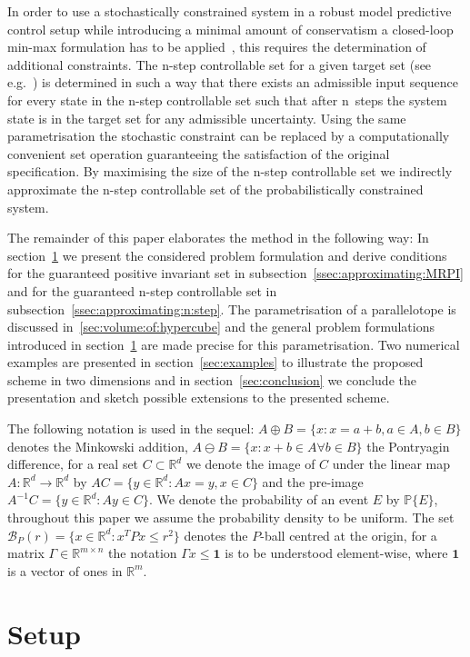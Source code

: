 \documentclass{ifacconf}
\providecommand{\B}{\mathcal B}
\providecommand{\PP}{\mathbb P}
\providecommand{\RR}{\mathbb R}
\providecommand{\bfa}[1]{\mathbf{#1}}
\begin{document}
In order to use a stochastically constrained system in a robust model predictive control setup while introducing a minimal amount of conservatism a closed-loop min-max formulation has to be applied~\cite{Lee:1997}, this requires the determination of additional constraints.
%
The n-step controllable set for a given target set (see e.g.~\cite{bertsekas71}) is determined in such a way that there exists an admissible input sequence for every state in the n-step controllable set such that after n~steps the system state is in the target set for any admissible uncertainty.
%
Using the same parametrisation the stochastic constraint can be replaced by a computationally convenient set operation guaranteeing the satisfaction of the original specification.
%
By maximising the size of the n-step controllable set we indirectly approximate the n-step controllable set of the probabilistically constrained system.

The remainder of this paper elaborates the method in the following way:
%
In section~\ref{sec:setup} we present the considered problem formulation and derive conditions for the guaranteed positive invariant set in subsection~\ref{ssec:approximating:MRPI} and for the guaranteed n-step controllable set in subsection~\ref{ssec:approximating:n:step}.
%
The parametrisation of a parallelotope is discussed in~\ref{sec:volume:of:hypercube} and the general problem formulations introduced in section~\ref{sec:setup} are made precise for this parametrisation.
%
Two numerical examples are presented in section~\ref{sec:examples} to illustrate the proposed scheme in two dimensions and in section~\ref{sec:conclusion} we conclude the presentation and sketch possible extensions to the presented scheme.

The following notation is used in the sequel: $A\oplus B = \{x:x=a+b,a\in A,b\in B\}$ denotes the Minkowski addition, $A\ominus B = \{x: x+b \in A\forall b\in B\}$ the Pontryagin difference, for a real set $C\subset\RR^d$ we denote the image of $C$ under the linear map $A:\RR^d\rightarrow\RR^d$ by $AC = \{y\in\RR^d:Ax=y,x\in C\}$ and the pre-image $A^{-1}C = \{y\in\RR^d:Ay\in C\}$.
%
We denote the probability of an event $E$ by $\PP\{E\}$, throughout this paper we assume the probability density to be uniform.
%
The set $\B_P(r) = \{x\in\RR^d:x^TPx\leq r^2\}$ denotes the $P$-ball centred at the origin, for a matrix $\Gamma\in\RR^{m\times n}$ the notation $\Gamma x\leq \bfa{1}$ is to be understood element-wise, where $\bfa{1}$ is a vector of ones in $\RR^m$.


\section{Setup}\label{sec:setup}
%
\end{document}
